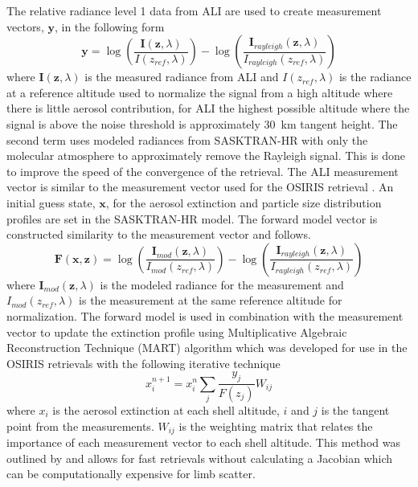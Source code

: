 \documentclass[12pt]{article}
\begin{document}
The relative radiance level 1 data from ALI are used to create measurement vectors, $\mathbf{y}$, in the following form
\begin{equation}
    \mathbf{y} = 
\log\left(\frac{\mathbf{I}(\mathbf{z},\lambda)}{I(z_{ref},\lambda)}\right)-\log\left(\frac{\mathbf{I}_{rayleigh}(\mathbf{z},\lambda)}{I_{rayleigh}(z_{ref},\lambda)}\right)
    \label{eqn:measurementVector}
\end{equation}
where $\mathbf{I}(\mathbf{z},\lambda)$ is the measured radiance from ALI and $I(z_{ref},\lambda)$ is the radiance at a reference altitude used to normalize the signal from a 
high altitude where there is little aerosol contribution, for ALI the highest possible altitude where the signal is above the noise threshold is approximately 30~km tangent 
height. The second term uses modeled radiances from SASKTRAN-HR with only the molecular atmosphere to approximately remove the Rayleigh signal. This is done to improve the speed 
of the convergence of the retrieval. The ALI measurement vector is similar to the measurement vector used for the OSIRIS retrieval \citep{Bourassa2007,Bourassa2011}. An initial 
guess state, $\mathbf{x}$, for the aerosol extinction and particle size distribution profiles are set in the SASKTRAN-HR model. The forward model vector is constructed 
similarity to the measurement vector and follows.
\begin{equation}
    \mathbf{F}(\mathbf{x},\mathbf{z}) = 
\log\left(\frac{\mathbf{I}_{mod}(\mathbf{z},\lambda)}{I_{mod}(z_{ref},\lambda)}\right)-\log\left(\frac{\mathbf{I}_{rayleigh}(\mathbf{z},\lambda)}{I_{rayleigh}(z_{ref},\lambda)}\right)
    \label{eqn:forwardModel}
\end{equation}
where $\mathbf{I}_{mod}(\mathbf{z},\lambda)$ is the modeled radiance for the measurement and $I_{mod}(z_{ref},\lambda)$ is the measurement at the same reference altitude for 
normalization. The forward model is used in combination with the measurement vector to update the extinction profile using Multiplicative Algebraic Reconstruction Technique 
(MART) algorithm which was developed for use in the OSIRIS retrievals \citep{Bourassa2012a} with the following iterative technique
\begin{equation}
    x_{i}^{n+1} = x_{i}^{n}\sum_{j}\frac{y_{j}}{F(z_{j})}W_{ij}
\end{equation}
where $x_{i}$ is the aerosol extinction at each shell altitude, $i$ and $j$ is the tangent point from the measurements. $W_{ij}$ is the weighting matrix that relates the 
importance of each measurement vector to each shell altitude. This method was outlined by \cite{Degenstein2009} and allows for fast retrievals without calculating a Jacobian 
which can be computationally expensive for limb scatter.
\end{document}
